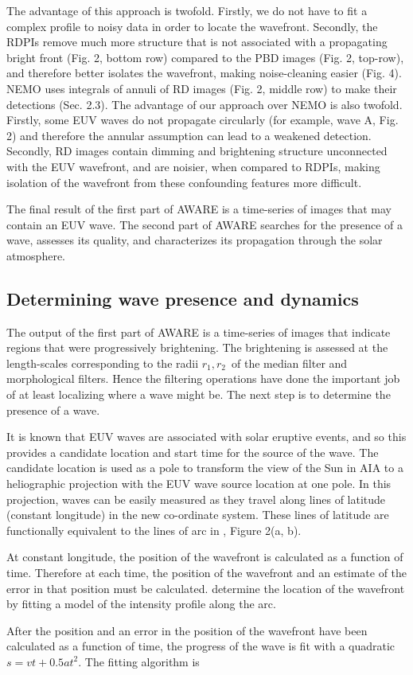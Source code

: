 The advantage of this approach is twofold. Firstly, we do not have to
fit a complex profile to noisy data in order to locate the
wavefront. Secondly, the RDPIs remove much more structure that is not
associated with a propagating bright front (Fig. 2, bottom row)
compared to the PBD images (Fig. 2, top-row), and therefore better
isolates the wavefront, making noise-cleaning easier (Fig. 4).  NEMO
\citep{2005SoPh..228..265P} uses integrals of annuli of RD images
(Fig. 2, middle row) to make their detections (Sec. 2.3).  The
advantage of our approach over NEMO is also twofold.  Firstly, some
EUV waves do not propagate circularly (for example, wave A, Fig. 2)
and therefore the annular assumption can lead to a weakened detection.
Secondly, RD images contain dimming and brightening structure
unconnected with the EUV wavefront, and are noisier, when compared to
RDPIs, making isolation of the wavefront from these confounding
features more difficult.

The final result of the first part of AWARE is a time-series of images
that may contain an EUV wave.  The second part of AWARE searches for
the presence of a wave, assesses its quality, and characterizes its
propagation through the solar atmosphere.

\subsection{Determining wave presence and
  dynamics}\label{sec:aware:dynamics}

The output of the first part of AWARE is a time-series of images that
indicate regions that were progressively brightening.  The brightening
is assessed at the length-scales corresponding to the radii $r_{1},
r_{2}$\textellipsis\ of the median filter and morphological filters.
Hence the filtering operations have done the important job of at least
localizing where a wave might be.  The next step is to determine the
presence of a wave.

It is known that EUV waves are associated with solar eruptive events,
and so this provides a candidate location and start time for the
source of the wave. The candidate location is used as a pole to
transform the view of the Sun in AIA to a heliographic projection with
the EUV wave source location at one pole.  In this projection, waves
can be easily measured as they travel along lines of latitude
(constant longitude) in the new co-ordinate system.  These lines of
latitude are functionally equivalent to the lines of arc in
\citet{2014SoPh..289.3279L}, Figure 2(a, b).

At constant longitude, the position of the wavefront is calculated as
a function of time.  Therefore at each time, the position of the
wavefront and an estimate of the error in that position must be
calculated. \citet{2014SoPh..289.3279L} determine the location of the
wavefront by fitting a model of the intensity profile along the arc.

%

After the position and an error in the position of the wavefront have
been calculated as a function of time, the progress of the wave is fit
with a quadratic $s = vt + 0.5at^{2}$.  The fitting algorithm is 

